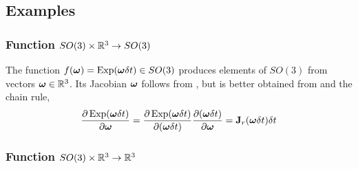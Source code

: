 %



\subsection{Examples}

\subsubsection{Function $SO(3)\times\bbR^3\to SO(3)$} 
\label{sec:jac_R3toSO3}

The function $f(\bw) = \Exp(\bw\dt)\in SO(3)$ produces elements of $SO(3)$ from vectors $\bw\in\bbR^3$. 
Its Jacobian \wrt $\bw$ follows from , but is better obtained from  and the chain rule,
%
\begin{align*}
\dpar{\Exp(\bw\dt)}{\bw}
= \dpar{\Exp(\bw\dt)}{(\bw\dt)}\dpar{(\bw\dt)}{\bw} 
= \bfJ_r(\bw\dt)\dt
\end{align*}
%


\subsubsection{Function $SO(3)\times\bbR^3\to\bbR^3$} 
\label{sec:jac_SO3xR3toR3}

